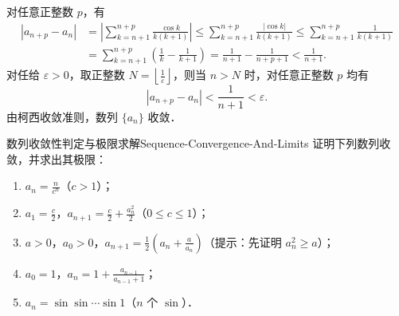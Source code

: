 \begin{myproof}
    对任意正整数 $p$，有
    \begin{equation}
        \begin{aligned}
            |a_{n+p} - a_n| & = \left| \sum_{k=n+1}^{n+p} \frac{\cos k}{k(k+1)} \right| \leqslant \sum_{k=n+1}^{n+p} \frac{|\cos k|}{k(k+1)} \leqslant \sum_{k=n+1}^{n+p} \frac{1}{k(k+1)} \\
                            & = \sum_{k=n+1}^{n+p} \left( \frac{1}{k} - \frac{1}{k+1} \right) = \frac{1}{n+1} - \frac{1}{n+p+1} < \frac{1}{n+1}.
        \end{aligned}
    \end{equation}
    对任给 $\varepsilon > 0$，取正整数 $N = \left\lfloor \frac{1}{\varepsilon} \right\rfloor$，则当 $n > N$ 时，对任意正整数 $p$ 均有
    \begin{equation}
        |a_{n+p} - a_n| < \frac{1}{n+1} < \varepsilon.
    \end{equation}
    由柯西收敛准则，数列 $\{a_n\}$ 收敛．
\end{myproof}

\begin{problem}{数列收敛性判定与极限求解}{Sequence-Convergence-And-Limits}
    证明下列数列收敛，并求出其极限：
    \begin{enumerate}
        \item $a_n = \frac{n}{c^n}$（$c > 1$）；
        \item $a_1 = \frac{c}{2}$，$a_{n+1} = \frac{c}{2} + \frac{a_n^2}{2}$（$0 \leqslant c \leqslant 1$）；
        \item $a > 0$，$a_0 > 0$，$a_{n+1} = \frac{1}{2}\left( a_n + \frac{a}{a_n} \right)$（提示：先证明 $a_n^2 \geqslant a$）；
        \item $a_0 = 1$，$a_n = 1 + \frac{a_{n-1}}{a_{n-1} + 1}$；
        \item $a_n = \sin \sin \cdots \sin 1$（$n$ 个 $\sin$）．
    \end{enumerate}
\end{problem}

